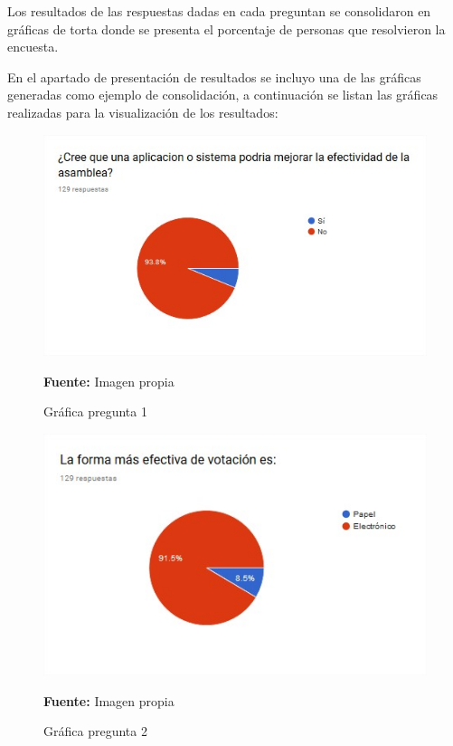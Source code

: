 \vspace{0.5cm}

Los resultados de las respuestas dadas en cada preguntan se consolidaron en gráficas de torta donde se presenta el porcentaje de personas que resolvieron la encuesta. 

\vspace{0.5cm}

En el apartado de presentación de resultados se incluyo una de las gráficas generadas como ejemplo de consolidación, a continuación se listan las gráficas realizadas para la visualización de los resultados:


\begin{figure}[th!]
	\centering
	\includegraphics[width=0.7\linewidth]{desarrollo/resultados/imgs/pregunta-1}
	\caption{Gráfica pregunta 1}{\scriptsize \textbf{Fuente:} Imagen propia}
\end{figure}


\begin{figure}[th!]
	\centering
	\includegraphics[width=0.7\linewidth]{desarrollo/resultados/imgs/pregunta-2}
	\caption{Gráfica pregunta 2}{\scriptsize \textbf{Fuente:} Imagen propia}
\end{figure}


